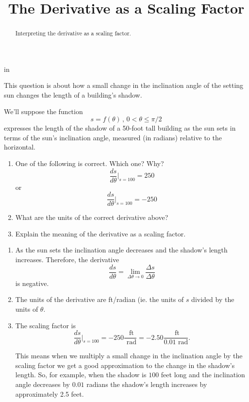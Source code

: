 \documentclass{ximera}
\title{The Derivative as a Scaling Factor}
\newcommand{\pskip}{\vskip 0.1 in}
\begin{document}
\begin{abstract}
Interpreting the derivative as a scaling factor.
\end{abstract}
\maketitle


\pskip



\begin{example}  \label{QK3fer33}
This question is about how a small change in the inclination angle of the setting sun changes the length of a building's shadow.

We'll suppose the function
\[
   s = f(\theta) \, , \, 0 < \theta \leq \pi/2
\]
expresses the length of the shadow of a 50-foot tall building as the sun sets in terms of the sun's inclination angle, measured (in radians) relative to the horizontal.

\begin{enumerate}
\item One of the following is correct. Which one? Why?
\[
    \frac{ds}{d\theta}\Big|_{s=100} = 250
\]
or 
\[
  \frac{ds}{d\theta}\Big|_{s=100} = -250
\]

\item What are the units of the correct derivative above?

\item Explain the meaning of the derivative as a scaling factor.
\end{enumerate}


\begin{explanation}
\begin{enumerate}
\item As the sun sets the inclination angle decreases and the shadow's length increases. Therefore, the derivative
\[
    \frac{ds}{d\theta} = \lim_{\Delta \theta \to 0} \frac{\Delta s}{\Delta \theta}
\]
is negative.

\item The units of the derivative are ft/radian (ie. the units of $s$ divided by the units of $\theta$.

\item The scaling factor is
\[
  \frac{ds}{d\theta}\Big|_{s=100} = -250 \frac{\text{ ft}}{\text{ rad}} = -2.50 \frac{\text{ ft}}{0.01 \text{ rad}} .
\]

This means when we multiply a small change in the inclination angle by the scaling factor we get a good approximation to the change in the shadow's length. So, for example, when the shadow is $100$ feet long and the inclination angle decreases by $0.01$ radians the shadow's length increases by approximately 2.5 feet.


\end{enumerate}
\end{explanation}
\end{example}
\end{document}
